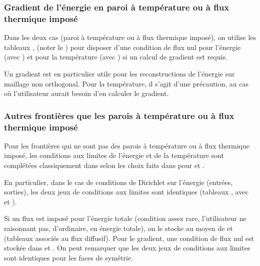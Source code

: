 \subsubsection*{Gradient de l'\'energie en paroi \`a temp\'erature ou \`a flux thermique impos\'e}

Dans les deux cas (paroi \`a temp\'erature ou \`a flux thermique impos\'e),
on utilise les tableaux
,
 (noter le ) pour disposer d'une
condition de flux nul pour l'\'energie (avec ) et
pour la temp\'erature (avec )
si un calcul de gradient est requis.

Un gradient est en particulier utile pour les reconstructions
de l'\'energie sur maillage non orthogonal.
Pour la temp\'erature, il s'agit d'une pr\'ecaution, au cas
o\`u l'utilisateur aurait besoin d'en calculer le gradient.

\subsubsection*{Autres fronti\`eres que les parois \`a temp\'erature ou \`a flux thermique impos\'e}

Pour les fronti\`eres qui ne sont pas des parois \`a temp\'erature ou
\`a flux thermique impos\'e, les conditions aux limites de l'\'energie et
de la temp\'erature sont compl\'et\'ees classiquement dans  selon
les choix faits dans  pour  et .

En particulier,
dans le cas de conditions de Dirichlet sur l'\'energie (entr\'ees, sorties), les
deux jeux de conditions aux limites sont identiques (tableaux
,  avec  et ).

Si un flux est impos\'e pour l'\'energie totale (condition assez rare,
l'utilisateur ne raisonnant pas,
d'ordinaire, en \'energie totale), on le stocke au moyen de
 et
 (tableaux associ\'es au flux
diffusif). Pour le gradient, une condition de flux nul est stock\'ee
dans
 et
. On peut remarquer que les deux
jeux de conditions aux limites sont identiques pour les faces de sym\'etrie.

